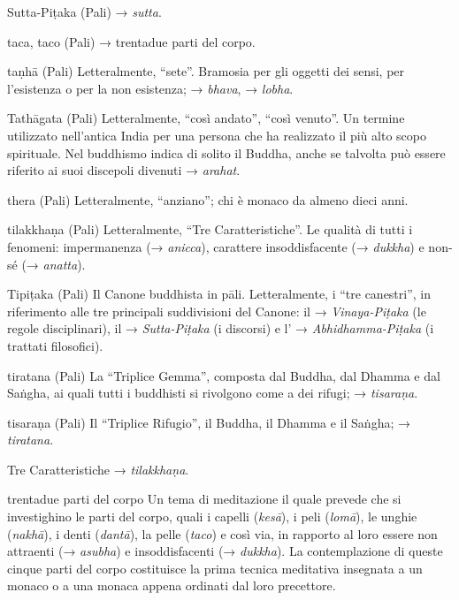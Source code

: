 \begin{glossarydescription}
\item[Sutta-Piṭaka] (Pali) → \emph{sutta}.


\item[taca, taco] (Pali) → trentadue parti del corpo.

\item[taṇhā] (Pali) Letteralmente, ``sete''. Bramosia per gli oggetti dei
sensi, per l'esistenza o per la non esistenza; → \emph{bhava}, →
\emph{lobha}.

\item[Tathāgata] (Pali) Letteralmente, ``così andato'', ``così venuto''. Un
termine utilizzato nell'antica India per una persona che ha realizzato
il più alto scopo spirituale. Nel buddhismo indica di solito il Buddha,
anche se talvolta può essere riferito ai suoi discepoli divenuti →
\emph{arahat}.

\item[thera] (Pali) Letteralmente, ``anziano''; chi è monaco da almeno dieci
anni.

\item[tilakkhaṇa] (Pali) Letteralmente, ``Tre Caratteristiche''. Le qualità di
tutti i fenomeni: impermanenza (→ \emph{anicca}), carattere
insoddisfacente (→ \emph{dukkha}) e non-sé (→ \emph{anatta}).

\item[Tipiṭaka] (Pali) Il Canone buddhista in pāli. Letteralmente, i ``tre
canestri'', in riferimento alle tre principali suddivisioni del Canone:
il → \emph{Vinaya-Piṭaka} (le regole disciplinari), il →
\emph{Sutta-Piṭaka} (i discorsi) e l' → \emph{Abhidhamma-Piṭaka} (i
trattati filosofici).

\item[tiratana] (Pali) La ``Triplice Gemma'', composta dal Buddha, dal Dhamma
e dal Saṅgha, ai quali tutti i buddhisti si rivolgono come a dei rifugi;
→ \emph{tisaraṇa}.

\item[tisaraṇa] (Pali) Il ``Triplice Rifugio'', il Buddha, il Dhamma e il
Saṅgha; → \emph{tiratana}.

\item[Tre Caratteristiche] → \emph{tilakkhaṇa}.

\item[trentadue parti del corpo] Un tema di meditazione il quale prevede che
si investighino le parti del corpo, quali i capelli (\emph{kesā}), i
peli (\emph{lomā}), le unghie (\emph{nakhā}), i denti (\emph{dantā}), la
pelle (\emph{taco}) e così via, in rapporto al loro essere non attraenti
(→ \emph{asubha}) e insoddisfacenti (→ \emph{dukkha}). La contemplazione
di queste cinque parti del corpo costituisce la prima tecnica meditativa
insegnata a un monaco o a una monaca appena ordinati dal loro
precettore.


\end{glossarydescription}
